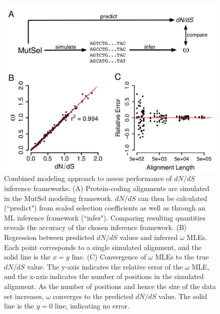 \documentclass[11pt]{article}
\begin{document}
		
\vspace{2cm}
		
\begin{figure}[htbp]
	\centerline{\includegraphics[width=12cm]{figures/MainText/regression_convergence.pdf}}
	\caption{\label{reg_conv} Combined modeling approach to assess performance of $dN/dS$ inference frameworks. (A) Protein-coding alignments are simulated in the MutSel modeling framework. $dN/dS$ can then be calculated (``predict") from scaled selection coefficients as well as through an ML inference framework (``infer"). Comparing resulting quantities reveals the accuracy of the chosen inference framework. (B) Regression between predicted $dN/dS$ values and inferred $\omega$ MLEs. Each point corresponds to a single simulated alignment, and the solid line is the $x=y$ line. (C) Convergence of $\omega$ MLEs to the true $dN/dS$ value. The y-axis indicates the relative error of the $\omega$ MLE, and the x-axis indicates the number of positions in the simulated alignment. As the number of positions and hence the size of the data set increases, $\omega$ converges to the predicted $dN/dS$ value. The solid line is the $y=0$ line, indicating no error.}
\end{figure}
	
\vspace{2cm}
	
\end{document}
